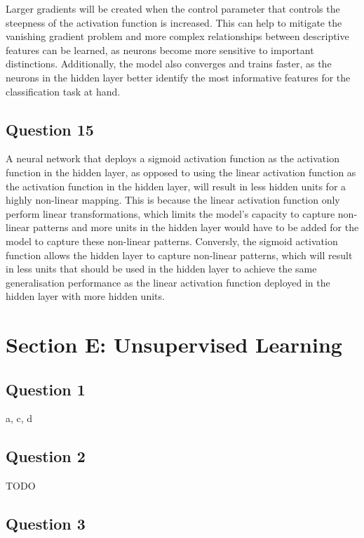 \documentclass[10pt]{article}
\begin{document}
Larger gradients will be created when the control parameter that controls the steepness of the activation function is increased.
This can help to mitigate the vanishing gradient problem and more complex relationships between descriptive features can be learned,
as neurons become more sensitive to important distinctions.
Additionally, the model also converges and trains faster, as the neurons in the hidden layer better identify the most informative features
for the classification task at hand.

\subsection*{Question 15}

A neural network that deploys a sigmoid activation function as the activation function in the hidden layer, as
opposed to using the linear activation function as the activation function in the hidden layer, will
result in less hidden units for a highly non-linear mapping. This is because the linear activation
function only perform linear transformations, which limits the model's capacity to capture non-linear
patterns and more units in the hidden layer would have to be added for the model to capture these non-linear patterns.
Conversly, the sigmoid activation function allows the hidden layer to capture non-linear patterns, which
will result in less units that should be used in the hidden layer to achieve the same generalisation
performance as the linear activation function deployed in the hidden layer with more hidden units.  

\section*{Section E: Unsupervised Learning}

\subsection*{Question 1}

a, c, d

\subsection*{Question 2}

TODO

\subsection*{Question 3}
\end{document}
